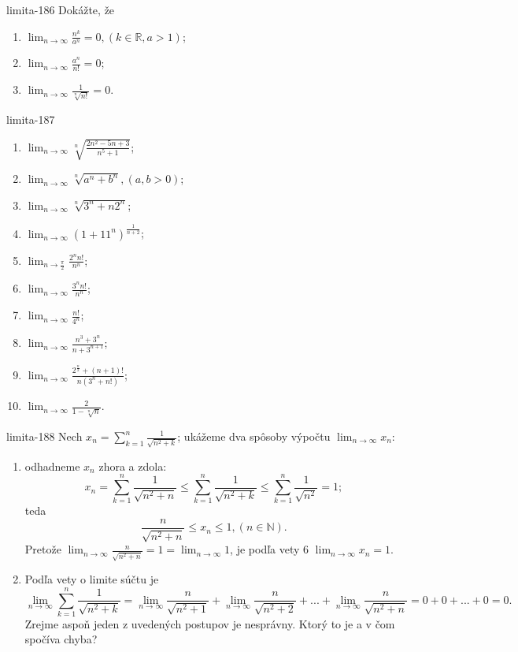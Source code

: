 \begin{defproblem}{limita-186}
Dokážte, že
\begin{enumerate}
\item $\lim_{n \rightarrow \infty} \frac{n^k}{a^n}=0,(k \in \mathbb{R},a>1)$;
\item $\lim_{n \rightarrow \infty} \frac{a^n}{n!}=0$;
\item $\lim_{n \rightarrow \infty} \frac{1}{\sqrt[n]{n!}}=0$.
\end{enumerate}
\end{defproblem}

\begin{defproblem}{limita-187}
\begin{multicols}{2}
\begin{enumerate}
    \item $\lim_{n \rightarrow \infty} \sqrt[n]{\frac{2n^2-5n+3}{n^5+1}}$;
    \item $\lim_{n \rightarrow \infty} \sqrt[n]{a^n+b^n},(a,b>0)$;
    \item $\lim_{n \rightarrow \infty} \sqrt[n]{3^n+n2^n}$;
    \item $\lim_{n \rightarrow \infty} (1+11^n)^{\frac{1}{n+2}}$;
    \item $\lim_{n \rightarrow \frac{\pi}{2}} \frac{2^nn!}{n^n}$;
    \item $\lim_{n \rightarrow \infty} \frac{3^nn!}{n^n}$;
    \item $\lim_{n \rightarrow \infty} \frac{n!}{4^n}$;
    \item $\lim_{n \rightarrow \infty} \frac{n^3+3^n}{n+3^{n+1}}$;
    \item $\lim_{n \rightarrow \infty} \frac{2^{\frac{n}{2}}+(n+1)!}{n(3^n+n!)}$;
    \item $\lim_{n \rightarrow \infty} \frac{2}{1-\sqrt[n]{n}}$.
\end{enumerate}
\end{multicols}
\end{defproblem}

\begin{defproblem}{limita-188}
Nech $x_n=\sum_{k=1}^n \frac{1}{\sqrt{n^2+k}}$; ukážeme dva spôsoby výpočtu $\lim_{n \rightarrow \infty} x_n:$
\begin{enumerate}
\item odhadneme $x_n$ zhora a zdola:
$$x_n=\sum_{k=1}^n \frac{1}{\sqrt{n^2+n}}\leq \sum_{k=1}^n \frac{1}{\sqrt{n^2+k}}\leq \sum_{k=1}^n \frac{1}{\sqrt{n^2}}=1;$$
teda $$\frac{n}{\sqrt{n^2+n}}\leq x_n \leq 1, (n \in \mathbb{N}).$$
Pretože $\lim_{n \rightarrow \infty} \frac{n}{\sqrt{n^2+n}}=1=\lim_{n \rightarrow \infty} 1$, je podľa vety $6$ $\lim_{n \rightarrow \infty} x_n=1$.
\item Podľa vety o limite súčtu je
$$\lim_{n \rightarrow \infty} \sum_{k=1}^n \frac{1}{\sqrt{n^2+k}}=\lim_{n \rightarrow \infty} \frac{n}{\sqrt{n^2+1}}+\lim_{n \rightarrow \infty} \frac{n}{\sqrt{n^2+2}}+...+\lim_{n \rightarrow \infty} \frac{n}{\sqrt{n^2+n}}=0+0+...+0=0.$$
Zrejme aspoň jeden z uvedených postupov je nesprávny. Ktorý to je a v čom spočíva chyba?
\end{enumerate}
\end{defproblem}

